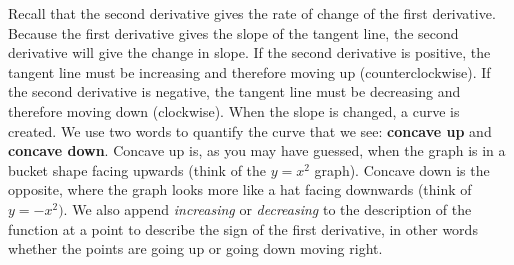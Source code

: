 \documentclass[../revisedmain.tex]{subfiles}
\begin{document}
	Recall that the second derivative gives the rate of change of the first derivative. Because the first derivative gives the slope of the tangent line, the second derivative will give the change in slope. If the second derivative is positive, the tangent line must be increasing and therefore moving up (counterclockwise). If the second derivative is negative, the tangent line must be decreasing and therefore moving down (clockwise). When the slope is changed, a curve is created. We use two words to quantify the curve that we see: \textbf{concave up} and \textbf{concave down}. Concave up is, as you may have guessed, when the graph is in a bucket shape facing upwards (think of the $y=x^2$ graph). Concave down is the opposite, where the graph looks more like a hat facing downwards (think of $y=-x^2)$. We also append \textit{increasing} or \textit{decreasing} to the description of the function at a point to describe the sign of the first derivative, in other words whether the points are going up or going down moving right.
		\begin{center}

		\end{center}
\end{document}
